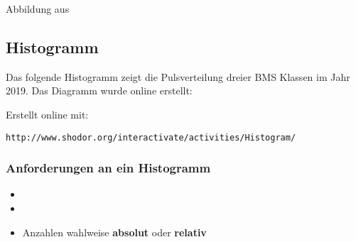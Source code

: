 
Abbildung aus \cite{marthaler21alg}
\newpage




\subsection{Histogramm}

Das folgende Histogramm zeigt die Pulsverteilung dreier BMS Klassen im Jahr 2019. Das Diagramm wurde online erstellt:


Erstellt online mit:

\texttt{http://www.shodor.org/interactivate/activities/Histogram/}

\newpage


\subsubsection{Anforderungen an ein Histogramm}
\begin{itemize}
\item {}
  \vspace{8mm}
\item {}
  \vspace{8mm}
  \item Anzahlen wahlweise \textbf{absolut} oder \textbf{relativ}
\end{itemize}

